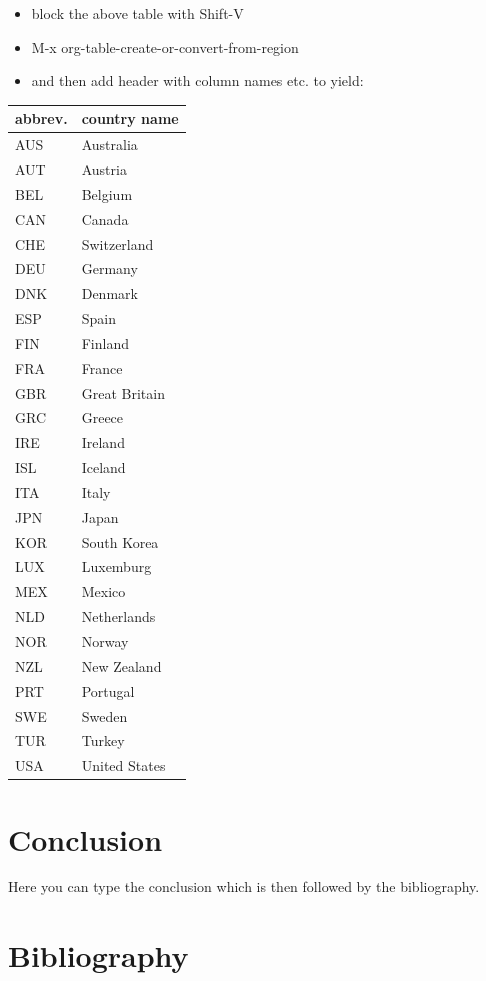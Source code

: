 \documentclass[11pt]{article}
\begin{document}
\begin{itemize}
\item block the above table with Shift-V
\item M-x org-table-create-or-convert-from-region
\item and then add header with column names etc. to yield:
\end{itemize}

\begin{center}
\begin{tabular}{ll}
abbrev. & country name\\
\hline
AUS & Australia\\
AUT & Austria\\
BEL & Belgium\\
CAN & Canada\\
CHE & Switzerland\\
DEU & Germany\\
DNK & Denmark\\
ESP & Spain\\
FIN & Finland\\
FRA & France\\
GBR & Great Britain\\
GRC & Greece\\
IRE & Ireland\\
ISL & Iceland\\
ITA & Italy\\
JPN & Japan\\
KOR & South Korea\\
LUX & Luxemburg\\
MEX & Mexico\\
NLD & Netherlands\\
NOR & Norway\\
NZL & New Zealand\\
PRT & Portugal\\
SWE & Sweden\\
TUR & Turkey\\
USA & United States\\
\end{tabular}
\end{center}


\section{Conclusion}

Here you can type the conclusion which is then followed by the bibliography.

\section{Bibliography}
\end{document}
